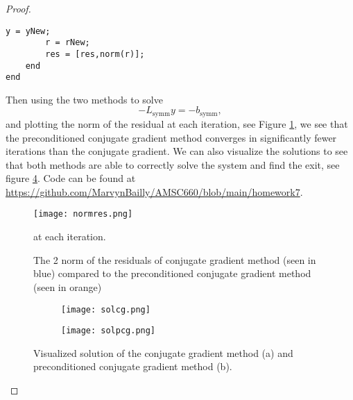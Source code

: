 \documentclass[12pt]{report}
\begin{document}
\begin{problem}
\begin{proof}
\begin{lstlisting}[style=Matlab-editor]
        y = yNew;
        r = rNew;
        res = [res,norm(r)];
    end
end
\end{lstlisting}
Then using the two methods to solve
\[
      -L_\text{symm}y = -b_\text{symm},
\]
and plotting the norm of the residual at each iteration, see Figure \ref{fig1}, we see that the preconditioned conjugate gradient method converges in significantly fewer iterations than the conjugate gradient. We can also visualize the solutions to see that both methods are able to correctly solve the system and find the exit, see figure \ref{fig2}. Code can be found at \url{https://github.com/MarvynBailly/AMSC660/blob/main/homework7}. 
\begin{figure}[H]
     \centering
     \texttt{[image: normres.png]}
     \caption{The 2 norm of the residuals of conjugate gradient method (seen in blue) compared to the preconditioned conjugate gradient method (seen in orange)} at each iteration.
     \label{fig1}
\end{figure}
\begin{figure}[H]
     \begin{subfigure}[b]{0.5\linewidth}
          \centering
          \texttt{[image: solcg.png]}
          \caption{}
          \label{fig2:a}
          \vspace{4ex}
     \end{subfigure}%
     \begin{subfigure}[b]{0.5\linewidth}
          \centering
          \texttt{[image: solpcg.png]}
          \caption{}
          \label{fig2:b}
          \vspace{4ex}
     \end{subfigure}
     \caption{Visualized solution of the conjugate gradient method (a) and preconditioned conjugate gradient method (b).}
     \label{fig2}
\end{figure}

\end{proof}
\end{problem}
\end{document}
